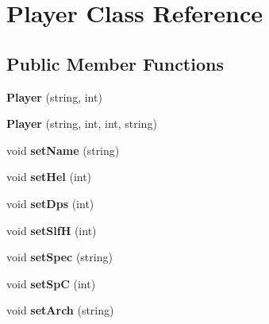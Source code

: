 \hypertarget{class_player}{}\section{Player Class Reference}
\label{class_player}
\subsection*{Public Member Functions}
\begin{DoxyCompactItemize}
\item 
\hypertarget{class_player_aaf1dcc6f6b07ba59fbbeb89f926cd0da}{}{\bfseries Player} (string, int)\label{class_player_aaf1dcc6f6b07ba59fbbeb89f926cd0da}

\item 
\hypertarget{class_player_a1f3ce001ef9ef11f684c1eda423afb30}{}{\bfseries Player} (string, int, int, string)\label{class_player_a1f3ce001ef9ef11f684c1eda423afb30}

\item 
\hypertarget{class_player_a8eaf43a2f2236b21d0101270ecca1483}{}void {\bfseries set\+Name} (string)\label{class_player_a8eaf43a2f2236b21d0101270ecca1483}

\item 
\hypertarget{class_player_a5a5c3fb613cdd39e0e5204b533b551e1}{}void {\bfseries set\+Hel} (int)\label{class_player_a5a5c3fb613cdd39e0e5204b533b551e1}

\item 
\hypertarget{class_player_ae6d6d983b16b87a06fd3a09c6d6cbce9}{}void {\bfseries set\+Dps} (int)\label{class_player_ae6d6d983b16b87a06fd3a09c6d6cbce9}

\item 
\hypertarget{class_player_ab3e462ddbce88ede112518c3b715ccd3}{}void {\bfseries set\+Slf\+H} (int)\label{class_player_ab3e462ddbce88ede112518c3b715ccd3}

\item 
\hypertarget{class_player_a7ed736a2b4f17eed42207871157d121f}{}void {\bfseries set\+Spec} (string)\label{class_player_a7ed736a2b4f17eed42207871157d121f}

\item 
\hypertarget{class_player_a7746aff7e9df46fb8fae15d9d69f74b8}{}void {\bfseries set\+Sp\+C} (int)\label{class_player_a7746aff7e9df46fb8fae15d9d69f74b8}

\item 
\hypertarget{class_player_aa8e47a34a37fca57dc36458521ad9735}{}void {\bfseries set\+Arch} (string)\label{class_player_aa8e47a34a37fca57dc36458521ad9735}


\end{DoxyCompactItemize}
